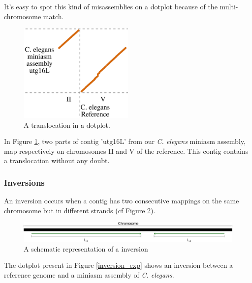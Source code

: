 \documentclass[./main.tex]{subfiles}
\begin{document}
It's easy to spot this kind of misassemblies on a dotplot because of the
multi-chromosome match.

\begin{figure}[ht]
    \centering
    \includegraphics[width=0.5\textwidth]{paper/misassemblies-in-noisy-assemblies/translocation_dotplot_exemple.pdf}
    \caption{A translocation in a dotplot.}
    \label{translocation_exp}
\end{figure}

In Figure \ref{translocation_exp}, two parts of contig 'utg16L' from our \emph{C. elegans} miniasm assembly, map respectively on chromosomes II and V of the reference. This contig contains a translocation without any doubt.

\subsubsection{Inversions}

An inversion occurs when a contig has two consecutive mappings on the
same chromosome but in different strands (cf Figure \ref{inversion_def}).

\begin{figure}[ht]
    \centering
    \includegraphics[width=\textwidth]{paper/misassemblies-in-noisy-assemblies/inversion_def.pdf}
    \caption{A schematic representation of a inversion}
    \label{inversion_def}
\end{figure}

The dotplot present in Figure \ref{inversion_exp} shows an inversion between a reference genome and a
miniasm assembly of \emph{C. elegans}.
\end{document}
